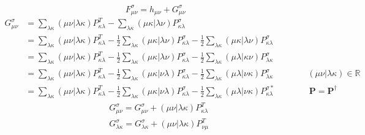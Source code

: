\documentclass[10pt]{article}
\begin{document}
\begin{equation}
F^\sigma_{\mu\nu} = h_{\mu\nu} + G^\sigma_{\mu\nu}
\end{equation}
\begin{align}
G^\sigma_{\mu\nu} &= \sum_{\lambda\kappa}(\mu\nu\vert\lambda\kappa)P^T_{\kappa\lambda} -\sum_{\lambda\kappa}(\mu\kappa\vert\lambda\nu)P^\sigma_{\kappa\lambda}\\
&=\sum_{\lambda\kappa}(\mu\nu\vert\lambda\kappa)P^T_{\kappa\lambda} -\frac{1}{2}\sum_{\lambda\kappa}(\mu\kappa\vert\lambda\nu)P^\sigma_{\kappa\lambda} -\frac{1}{2}\sum_{\lambda\kappa}(\mu\kappa\vert\lambda\nu)P^\sigma_{\kappa\lambda}\\
&=\sum_{\lambda\kappa}(\mu\nu\vert\lambda\kappa)P^T_{\kappa\lambda} -\frac{1}{2}\sum_{\lambda\kappa}(\mu\kappa\vert\lambda\nu)P^\sigma_{\kappa\lambda} -\frac{1}{2}\sum_{\lambda\kappa}(\mu\lambda\vert\kappa\nu)P^\sigma_{\lambda\kappa}\\
&=\sum_{\lambda\kappa}(\mu\nu\vert\lambda\kappa)P^T_{\kappa\lambda} -\frac{1}{2}\sum_{\lambda\kappa}(\mu\kappa\vert\nu\lambda)P^\sigma_{\kappa\lambda} -\frac{1}{2}\sum_{\lambda\kappa}(\mu\lambda\vert\nu\kappa)P^{\sigma}_{\lambda\kappa} \qquad\qquad (\mu\nu\vert\lambda\kappa)\in\mathbb{R}\\
&=\sum_{\lambda\kappa}(\mu\nu\vert\lambda\kappa)P^T_{\kappa\lambda} -\frac{1}{2}\sum_{\lambda\kappa}(\mu\kappa\vert\nu\lambda)P^\sigma_{\kappa\lambda} -\frac{1}{2}\sum_{\lambda\kappa}(\mu\lambda\vert\nu\kappa)P^{\sigma*}_{\kappa\lambda} \qquad\qquad \mathbf{P}=\mathbf{P}^\dagger
\end{align}
\begin{align}
&G^\sigma_{\mu\nu} = G^\sigma_{\mu\nu} + (\mu\nu\vert\lambda\kappa)P^T_{\kappa\lambda}\\
&G^\sigma_{\lambda\kappa} = G^\sigma_{\lambda\kappa} + (\mu\nu\vert\lambda\kappa)P^T_{\nu\mu}\\
\end{align}
\end{document}
